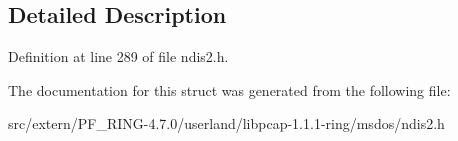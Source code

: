\subsection{Detailed Description}


Definition at line 289 of file ndis2.h.



The documentation for this struct was generated from the following file:\begin{DoxyCompactItemize}
\item 
src/extern/PF\_\-RING-\/4.7.0/userland/libpcap-\/1.1.1-\/ring/msdos/ndis2.h\end{DoxyCompactItemize}
